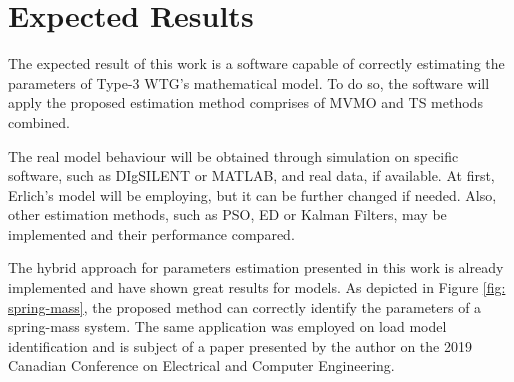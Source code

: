 \chapter{Expected Results}

\label{ch: Res}

The expected result of this work is a software capable of correctly estimating the parameters of Type-3 WTG's mathematical model. To do so, the software will apply the proposed estimation method comprises of MVMO and TS methods combined. 

The real model behaviour will be obtained through simulation on specific software, such as DIgSILENT or MATLAB, and real data, if available. At first, Erlich's model will be employing, but it can be further changed if needed. Also, other estimation methods, such as PSO, ED or Kalman Filters, may be implemented and their performance compared.

The hybrid approach for parameters estimation presented in this work is already implemented and have shown great results for models. As depicted in Figure \ref{fig: spring-mass}, the proposed method can correctly identify the parameters of a spring-mass system. The same application was employed on load model identification and is subject of a paper presented by the author on the 2019 Canadian Conference on Electrical and Computer Engineering.